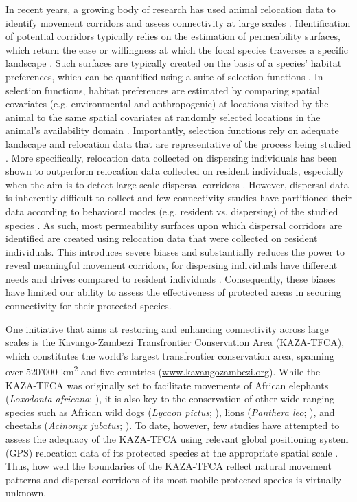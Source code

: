 \documentclass[abstract=on,10pt,a4paper,bibliography=totocnumbered]{article}
\begin{document}
In recent years, a growing body of research has used animal relocation data to
identify movement corridors and assess connectivity at large scales
\citep{Chetkiewicz.2006, Doerr.2011, Squires.2013, Elliot.2014, Benz.2016,
Osipova.2019}. Identification of potential corridors typically relies on the
estimation of permeability surfaces, which return the ease or willingness at
which the focal species traverses a specific landscape \citep{Sawyer.2011}. Such
surfaces are typically created on the basis of a species' habitat preferences,
which can be quantified using a suite of selection functions \citep{Boyce.2002,
Fortin.2005, Cushman.2010, Zeller.2012}. In selection functions, habitat
preferences are estimated by comparing spatial covariates (e.g. environmental
and anthropogenic) at locations visited by the animal to the same spatial
covariates at randomly selected locations in the animal's availability domain
\citep{Zeller.2012, Thurfjell.2014}. Importantly, selection functions rely on
adequate landscape and relocation data that are representative of the process
being studied \citep{Diniz.2020}. More specifically, relocation data collected
on dispersing individuals has been shown to outperform relocation data collected
on resident individuals, especially when the aim is to detect large scale
dispersal corridors \citep{Elliot.2014, Diniz.2020}. However, dispersal data is
inherently difficult to collect and few connectivity studies have partitioned
their data according to behavioral modes (e.g. resident vs. dispersing) of the
studied species \citep{Wilson.2012, Vasudev.2015}. As such, most permeability
surfaces upon which dispersal corridors are identified are created using
relocation data that were collected on resident individuals. This introduces
severe biases and substantially reduces the power to reveal meaningful movement
corridors, for dispersing individuals have different needs and drives compared
to resident individuals \citep{Killeen.2014, Elliot.2014, Cozzi.2020}.
Consequently, these biases have limited our ability to assess the effectiveness
of protected areas in securing connectivity for their protected species.

One initiative that aims at restoring and enhancing connectivity across large
scales is the Kavango-Zambezi Transfrontier Conservation Area (KAZA-TFCA), which
constitutes the world's largest transfrontier conservation area, spanning over
520'000 km\textsuperscript{2} and five countries (\url{www.kavangozambezi.org}).
While the KAZA-TFCA was originally set to facilitate movements of African
elephants (\textit{Loxodonta africana}; \citealp{Tshipa.2017}), it is also key
to the conservation of other wide-ranging species such as African wild dogs
(\textit{Lycaon pictus}; \citealp{Woodroffe.2012, Cozzi.2020}), lions
(\textit{Panthera leo}; \citealp{Elliot.2014, Cushman.2018}), and cheetahs
(\textit{Acinonyx jubatus}; \citealp{Weise.2017}). To date, however, few studies
have attempted to assess the adequacy of the KAZA-TFCA using relevant global
positioning system (GPS) relocation data of its protected species at the
appropriate spatial scale \citep{Elliot.2014, Tshipa.2017}. Thus, how well the
boundaries of the KAZA-TFCA reflect natural movement patterns and dispersal
corridors of its most mobile protected species is virtually unknown.
\end{document}
